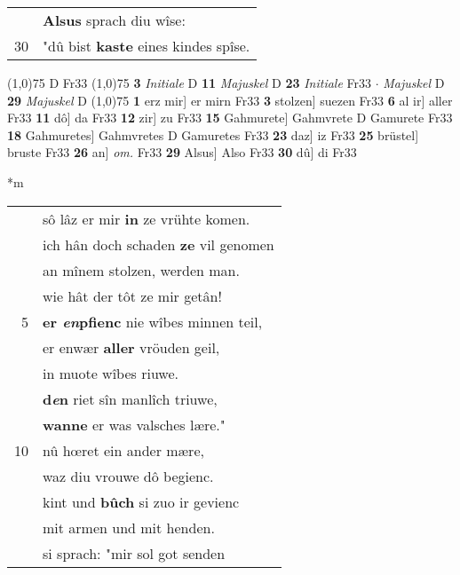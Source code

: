 \documentclass[8pt,a4paper,notitlepage]{article}
\begin{document}
\begin{table}[ht]
\begin{minipage}[t]{0.5\linewidth}
\begin{tabular}{rl}
 & \textbf{Alsus} sprach diu wîse:\\ 
30 & "dû bist \textbf{kaste} eines kindes spîse.\\ 
\end{tabular}
\scriptsize
\line(1,0){75} \newline
D Fr33 \newline
\line(1,0){75} \newline
\textbf{3} \textit{Initiale} D  \textbf{11} \textit{Majuskel} D  \textbf{23} \textit{Initiale} Fr33   $\cdot$ \textit{Majuskel} D  \textbf{29} \textit{Majuskel} D  \newline
\line(1,0){75} \newline
\textbf{1} erz mir] er mirn Fr33 \textbf{3} stolzen] suezen Fr33 \textbf{6} al ir] aller Fr33 \textbf{11} dô] da Fr33 \textbf{12} zir] zu Fr33 \textbf{15} Gahmurete] Gahmvrete D Gamurete Fr33 \textbf{18} Gahmuretes] Gahmvretes D Gamuretes Fr33 \textbf{23} daz] iz Fr33 \textbf{25} brüstel] bruste Fr33 \textbf{26} an] \textit{om.} Fr33 \textbf{29} Alsus] Also Fr33 \textbf{30} dû] di Fr33 \newline
\end{minipage}
\hspace{0.5cm}
\begin{minipage}[t]{0.5\linewidth}
\small
\begin{center}*m
\end{center}
\begin{tabular}{rl}
 & sô lâz er mir \textbf{in} ze vrühte komen.\\ 
 & ich hân doch schaden \textbf{ze} vil genomen\\ 
 & an mînem stolzen, werden man.\\ 
 & wie hât der tôt ze mir getân!\\ 
5 & \textbf{er \textit{en}pfienc} nie wîbes minnen teil,\\ 
 & er enwær \textbf{aller} vröuden geil,\\ 
 & in muote wîbes riuwe.\\ 
 & \textbf{d\textit{e}n} riet sîn manlîch triuwe,\\ 
 & \textbf{wanne} er was valsches lære."\\ 
10 & nû hœret ein ander mære,\\ 
 & waz diu vrouwe dô begienc.\\ 
 & kint und \textbf{bûch} si zuo ir gevienc\\ 
 & mit armen und mit henden.\\ 
 & si sprach: "mir sol got senden\\ 

\end{tabular}
\end{minipage}
\end{table}
\end{document}
